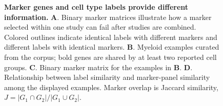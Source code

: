 \begin{figure}[t]
\centering
\resizebox{\textwidth}{!}{%
}
\caption{\textbf{Marker genes and cell type labels provide different information.} \textbf{A}. Binary marker matrices illustrate how a marker selected within one study can fail after studies are combined. Colored outlines indicate identical labels with different markers and different labels with identical markers. \textbf{B}. Myeloid examples curated from the corpus; bold genes are shared by at least two reported cell groups. \textbf{C}. Binary marker matrix for the examples in \textbf{B}. \textbf{D}. Relationship between label similarity and marker-panel similarity among the displayed examples. Marker overlap is Jaccard similarity, $J=|G_1\cap G_2|/|G_1\cup G_2|$.}
\label{fig:paper_celltype_joint}
%
%
\end{figure}
